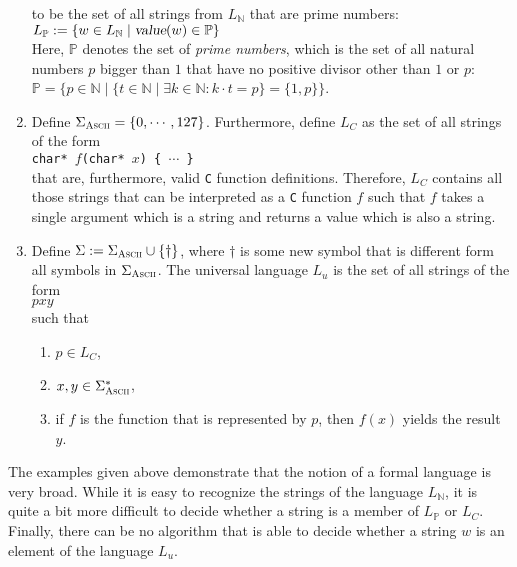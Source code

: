 \begin{enumerate}
      to be the set of all strings from $L_\mathbb{N}$ that are prime numbers:
      \\[0.2cm]
      \hspace*{1.3cm}
      $L_\mathbb{P} := \{ w \in L_\mathbb{N} \mid \textsl{value}(w) \in \mathbb{P} \}$
      \\[0.2cm]
      Here, $\mathbb{P}$ denotes the set of \emph{prime numbers}, which is the set of all natural
      numbers $p$ bigger than $1$ that have no positive divisor other than $1$ or $p$:
      \\[0.2cm]
      \hspace*{1.3cm}
      $\mathbb{P} = \bigl\{ p \in \mathbb{N} \;\big|\; \{ t \in \mathbb{N} \mid \exists k \in
      \mathbb{N} : k \cdot t = p \} = \{1, p\} \bigr\}$.
\item Define $\Sigma_{\textsc{\scriptsize Ascii}} = \{ 0, \cdots, 127\}$.  Furthermore, define $L_C$
      as the set of all strings of the form
      \\[0.2cm]
      \hspace*{1.3cm}
      \texttt{char* $f$(char* $x$) \{ $\cdots$ \}}
      \\[0.2cm]
      that are, furthermore, valid \texttt{C} function definitions.
      Therefore,  $L_C$ contains all those strings that can be interpreted as a \texttt{C} function $f$
      such that $f$ takes a single argument which is a string and returns a value which is also a
      string.
\item Define $\Sigma := \Sigma_{\textsc{\scriptsize Ascii}} \cup \{\dag\}$, where
      $\mathtt{\dag}$ is some new symbol that is different form all symbols in
      $\Sigma_{\textsc{\scriptsize Ascii}}$.
      The universal language $L_u$ is the set of all strings of the form
      \\[0.2cm]
      \hspace*{1.3cm}
      $p$\dag$x$\dag$y$
      \\[0.2cm]
      such that
      \begin{enumerate}
      \item $p \in L_C$,
      \item $x,y \in \Sigma_{\textsc{Ascii}}^*$,
      \item if $f$ is the function that is represented by $p$, then $f(x)$ yields the result $y$.
            \eox
      \end{enumerate}
\end{enumerate}
The examples given above demonstrate that the notion of a formal language is very broad.
While it is easy to recognize the strings of the language $L_\mathbb{N}$, it is quite a bit more
difficult to decide whether a string is a member of 
$L_\mathbb{P}$ or $L_C$.  Finally, there can be no algorithm that is able to decide whether a string
$w$ is an element of the language $L_u$. 

